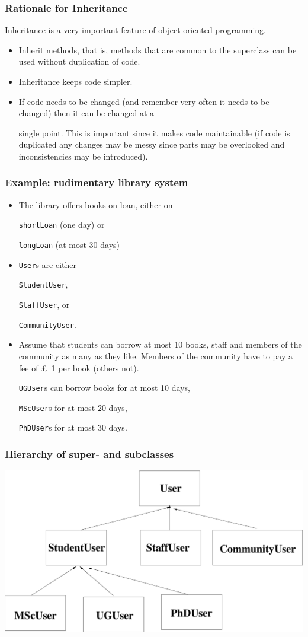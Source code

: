 \documentclass{beamer}
\def\mcolor#1#2{\rule{0ex}{0ex}\color{#1}#2\color{black}{}}
\begin{document}
\begin{frame}
\frametitle{Rationale for Inheritance}

\mcolor{blue}{Inheritance is a very important feature of object
  oriented programming.}

\begin{itemize}
  \item Inherit methods, that is, methods that are common to the
    superclass can be used without duplication of code.
  \item Inheritance keeps code simpler.
  \item If code needs to be changed (and remember very often it needs
    to be changed) then it can be changed at a \mcolor{blue}{single
      point}. This is important since it makes code maintainable (if
    code is duplicated any changes may be messy since parts may be
    overlooked and inconsistencies may be introduced).
\end{itemize}

\end{frame}

\begin{frame}
\frametitle{Example: rudimentary library system}

\begin{itemize}
\item The library offers books on loan, either on
  \mcolor{blue}{\texttt{shortLoan}} (one day) or
  \mcolor{blue}{\texttt{longLoan}} (at most 30 days)
\item \mcolor{blue}{\texttt{User}}s are either
  \mcolor{blue}{\texttt{StudentUser}},
  \mcolor{blue}{\texttt{StaffUser}}, or
  \mcolor{blue}{\texttt{CommunityUser}}.
\item Assume that students can borrow at most 10 books, staff and
  members of the community as many as they like. Members of the
  community have to pay a fee of \pounds~1 per book (others
  not). \mcolor{blue}{\texttt{UGUser}}s can borrow books for at
  most 10 days, \mcolor{blue}{\texttt{MScUser}}s for at most 20
  days, \mcolor{blue}{\texttt{PhDUser}}s for at most 30 days.
\end{itemize}
\end{frame}

\begin{frame}
\frametitle{Hierarchy of super- and subclasses}
\includegraphics[height=.65\textheight]{super}
\end{frame}
\end{document}
